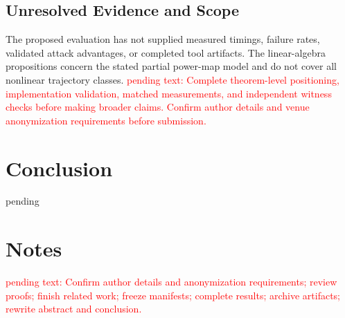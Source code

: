 \documentclass[conference]{IEEEtran}
\theoremstyle{definition}
\theoremstyle{plain}
\begin{document}
\subsection{Unresolved Evidence and Scope}
The proposed evaluation has not supplied measured timings, failure
rates, validated attack advantages, or completed tool artifacts.
The linear-algebra propositions concern the stated partial power-map
model and do not cover all nonlinear trajectory classes.
\textcolor{red}{pending text: Complete theorem-level positioning,
implementation validation, matched measurements, and independent
witness checks before making broader claims. Confirm author details
and venue anonymization requirements before submission.}


\section{Conclusion}
pending

\printbibliography


\appendices
\section{Notes}
\textcolor{red}{pending text: Confirm author details and anonymization
requirements; review proofs; finish related work; freeze manifests;
complete results; archive artifacts; rewrite abstract and conclusion.}
\end{document}
